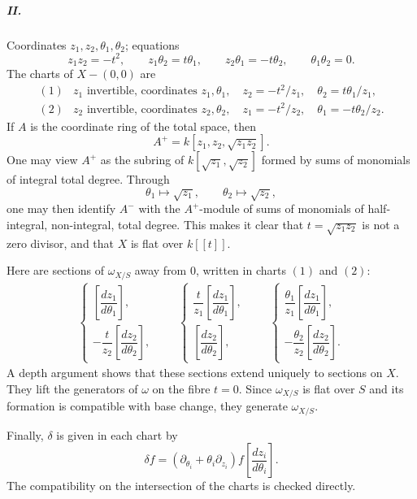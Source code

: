 \documentclass[11pt]{article}
\begin{document}
\subparagraph{II.}
Coordinates $z_1,z_2,\theta_1,\theta_2$; equations
\[
  z_1z_2=-t^2,
  \qquad
  z_1\theta_2=t\theta_1,
  \qquad
  z_2\theta_1=-t\theta_2,
  \qquad
  \theta_1\theta_2=0.
\]
The charts of $X-(0,0)$ are
\[
\begin{array}{ll}
(1)& z_1\text{ invertible, coordinates }z_1,\theta_1,
\quad z_2=-t^2/z_1,
\quad \theta_2=t\theta_1/z_1,\\[0.6ex]
(2)& z_2\text{ invertible, coordinates }z_2,\theta_2,
\quad z_1=-t^2/z_2,
\quad \theta_1=-t\theta_2/z_2.
\end{array}
\]
If $A$ is the coordinate ring of the total space, then
\[
  A^+=k[z_1,z_2,\sqrt{z_1z_2}].
\]
One may view $A^+$ as the subring of $k[\sqrt{z_1},\sqrt{z_2}]$ formed by sums of monomials of integral total degree. Through
\[
  \theta_1\mapsto\sqrt{z_1},\qquad \theta_2\mapsto\sqrt{z_2},
\]
one may then identify $A^-$ with the $A^+$-module of sums of monomials of half-integral, non-integral, total degree. This makes it clear that $t=\sqrt{z_1z_2}$ is not a zero divisor, and that $X$ is flat over $k[[t]]$.

Here are sections of $\omega_{X/S}$ away from $0$, written in charts $(1)$ and $(2)$:
\[
\begin{gathered}
  \begin{cases}
  \left[\dfrac{dz_1}{d\theta_1}\right],\\[0.8ex]
  -\dfrac{t}{z_2}\left[\dfrac{dz_2}{d\theta_2}\right],
  \end{cases}
\qquad
  \begin{cases}
  \dfrac{t}{z_1}\left[\dfrac{dz_1}{d\theta_1}\right],\\[0.8ex]
  \left[\dfrac{dz_2}{d\theta_2}\right],
  \end{cases}
\qquad
  \begin{cases}
  \dfrac{\theta_1}{z_1}\left[\dfrac{dz_1}{d\theta_1}\right],\\[1.0ex]
  -\dfrac{\theta_2}{z_2}\left[\dfrac{dz_2}{d\theta_2}\right].
  \end{cases}
\end{gathered}
\]
A depth argument shows that these sections extend uniquely to sections on $X$. They lift the generators of $\omega$ on the fibre $t=0$. Since $\omega_{X/S}$ is flat over $S$ and its formation is compatible with base change, they generate $\omega_{X/S}$.

Finally, $\delta$ is given in each chart by
\[
  \delta f=(\partial_{\theta_i}+\theta_i\partial_{z_i})f
  \left[\frac{dz_i}{d\theta_i}\right].
\]
The compatibility on the intersection of the charts is checked directly.
\end{document}
